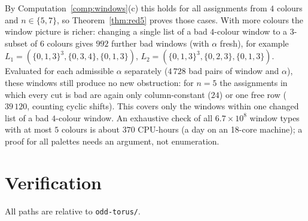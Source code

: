 \documentclass[11pt]{article}
\theoremstyle{plain}
\theoremstyle{definition}
\theoremstyle{remark}
\begin{document}
By Computation~\ref{comp:windows}(c) this holds for all assignments from $4$ colours and
$n \in \{5, 7\}$, so Theorem~\ref{thm:red5} proves those cases. With more colours the window
picture is richer: changing a single list of a bad $4$-colour window to a 3-subset of $6$ colours
gives $992$ further bad windows (with $\alpha$ fresh), for example
$L_1 = (\{0,1,3\}^3, \{0,3,4\}, \{0,1,3\})$, $L_2 = (\{0,1,3\}^3, \{0,2,3\}, \{0,1,3\})$. Evaluated for each
admissible $\alpha$ separately ($4\,728$ bad pairs of window and $\alpha$), these windows still
produce no new obstruction: for $n = 5$ the assignments in which every cut is bad are again only
column-constant ($24$) or one free row ($39\,120$, counting cyclic shifts). This covers only the
windows within one changed list of a bad $4$-colour window. An exhaustive check of all
$6.7 \times 10^8$ window types with at most $5$ colours is about $370$ CPU-hours (a day on an 18-core machine); a proof for all
palettes needs an argument, not enumeration.

\section{Verification}\label{sec:verification}

All paths are relative to \texttt{odd-torus/}.
\end{document}

